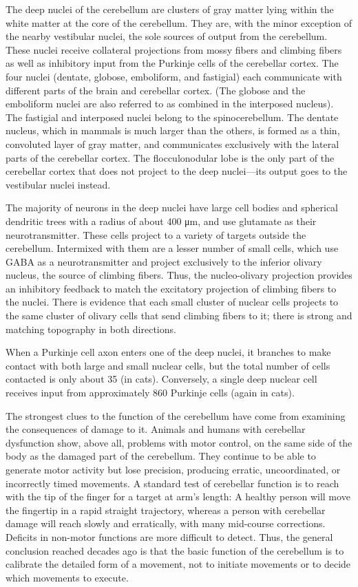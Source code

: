 The deep nuclei of the cerebellum are clusters of gray matter lying within the white matter at the core of the cerebellum. They are, with the minor exception of the nearby vestibular nuclei, the sole sources of output from the cerebellum. These nuclei receive collateral projections from mossy fibers and climbing fibers as well as inhibitory input from the Purkinje cells of the cerebellar cortex. The four nuclei (dentate, globose, emboliform, and fastigial) each communicate with different parts of the brain and cerebellar cortex. (The globose and the emboliform nuclei are also referred to as combined in the interposed nucleus). The fastigial and interposed nuclei belong to the spinocerebellum. The dentate nucleus, which in mammals is much larger than the others, is formed as a thin, convoluted layer of gray matter, and communicates exclusively with the lateral parts of the cerebellar cortex. The flocculonodular lobe is the only part of the cerebellar cortex that does not project to the deep nuclei---its output goes to the vestibular nuclei instead.

The majority of neurons in the deep nuclei have large cell bodies and spherical dendritic trees with a radius of about 400 μm, and use glutamate as their neurotransmitter. These cells project to a variety of targets outside the cerebellum. Intermixed with them are a lesser number of small cells, which use GABA as a neurotransmitter and project exclusively to the inferior olivary nucleus, the source of climbing fibers. Thus, the nucleo-olivary projection provides an inhibitory feedback to match the excitatory projection of climbing fibers to the nuclei. There is evidence that each small cluster of nuclear cells projects to the same cluster of olivary cells that send climbing fibers to it; there is strong and matching topography in both directions.

When a Purkinje cell axon enters one of the deep nuclei, it branches to make contact with both large and small nuclear cells, but the total number of cells contacted is only about 35 (in cats). Conversely, a single deep nuclear cell receives input from approximately 860 Purkinje cells (again in cats).

The strongest clues to the function of the cerebellum have come from examining the consequences of damage to it. Animals and humans with cerebellar dysfunction show, above all, problems with motor control, on the same side of the body as the damaged part of the cerebellum. They continue to be able to generate motor activity but lose precision, producing erratic, uncoordinated, or incorrectly timed movements. A standard test of cerebellar function is to reach with the tip of the finger for a target at arm's length: A healthy person will move the fingertip in a rapid straight trajectory, whereas a person with cerebellar damage will reach slowly and erratically, with many mid-course corrections. Deficits in non-motor functions are more difficult to detect. Thus, the general conclusion reached decades ago is that the basic function of the cerebellum is to calibrate the detailed form of a movement, not to initiate movements or to decide which movements to execute.

